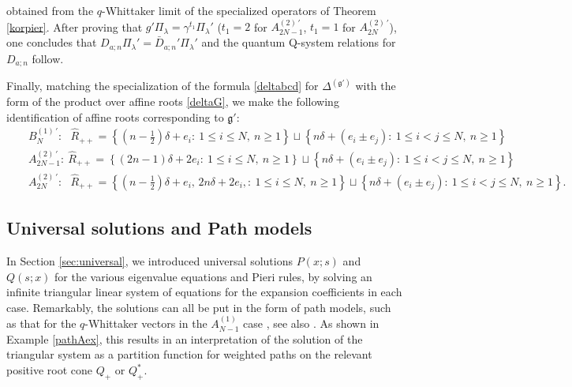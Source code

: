 \documentclass[12pt]{amsart}
\newcommand{\g}{{\mathfrak{g}}}
\newcommand{\half}{\frac{1}{2}}
\numberwithin{equation}{section}
\begin{document}
obtained from the $q$-Whittaker limit of the specialized operators of Theorem \eqref{korpier}.  After proving that
$g'\Pi_\lambda=\gamma^{t_1}\Pi_\lambda'$ ($t_1=2$ for $A_{2N-1}^{(2)\,'}$, $t_1=1$ for $A_{2N}^{(2)\,'}$), 
one concludes that $D_{a;n}\Pi_\lambda'=\bar D_{a;n}'\Pi_\lambda'$ and the quantum Q-system relations for $D_{a;n}$ follow.

Finally, matching the specialization of the formula \eqref{deltabcd} for $\Delta^{(\g')}$ with the form  of the product over affine roots \eqref{deltaG}, we make the following identification of affine roots corresponding to $\g'$:
\begin{eqnarray*}
&&B_N^{(1)\,'}:\ \ \ \widehat{R}_{++} = \scriptstyle{\left\{
(n-\half)\delta+e_i:  \ 1\leq i\leq N, \ n\geq 1\right\} \sqcup \left\{ n\delta+(e_i\pm e_j):\  1\leq i<j\leq N,\  n\geq 1 \right\}}\\
&&A_{2N-1}^{(2)\,'}:\ \widehat{R}_{++} = \scriptstyle{\left\{ (2n-1)\delta+2 e_i: \ 1\leq i\leq N,\  n\geq 1\right\} \sqcup\left\{ n\delta+(e_i\pm e_j): \ 1\leq i<j\leq N,\ n\geq 1\right\}}\\
&&A_{2N}^{(2)\,'}:\ \ \ \widehat{R}_{++} = \scriptstyle{\left\{(n-\half)\delta+e_i,\, 2n\delta+2 e_i,: \ 1\leq i\leq N,\  n\geq 1\right\}\sqcup\left\{ n\delta+(e_i\pm e_j): \ 1\leq i<j\leq N,\ n\geq 1\right\}}.
\end{eqnarray*}

\subsection{Universal solutions and Path models}\label{sec:paths}

In Section \ref{sec:universal}, we  introduced universal solutions $P(x;s)$ and $Q(s;x)$ for the
various eigenvalue equations and Pieri rules, by solving an infinite triangular linear system of equations for the expansion coefficients in each case. Remarkably,
the solutions can all be put in the form of path models, 
such as that for the $q$-Whittaker vectors in the $A_{N-1}^{(1)}$ case 
\cite{DKT}, see also \cite{gotsy}. As shown in Example \ref{pathAex}, this results in an interpretation of the solution of the triangular system as a partition function for weighted paths on the relevant positive root cone $Q_+$ or $Q_+^*$.
\end{document}
